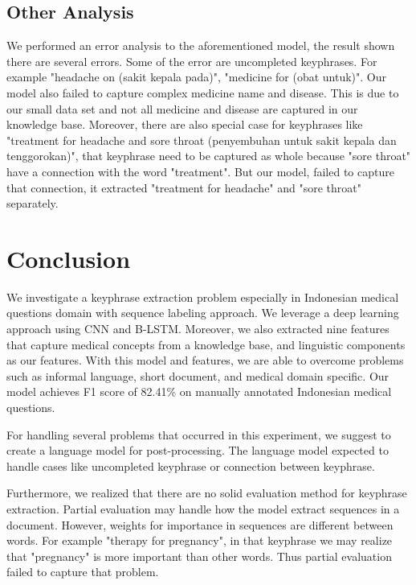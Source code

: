 \subsection{Other Analysis}
We performed an error analysis to the aforementioned model, the result shown there are several errors. Some of the error are uncompleted keyphrases. For example "headache on (sakit kepala pada)", "medicine for (obat untuk)". Our model also failed to capture complex medicine name and disease. This is due to our small data set and not all medicine and disease are captured in our knowledge base. Moreover, there are also special case for keyphrases like "treatment for headache and sore throat (penyembuhan untuk sakit kepala dan tenggorokan)", that keyphrase need to be captured as whole because "sore throat" have a connection with the word "treatment". But our model, failed to capture that connection, it extracted "treatment for headache" and "sore throat" separately.
\section{Conclusion}
We investigate a keyphrase extraction problem especially in Indonesian medical questions domain with sequence labeling approach. We leverage a deep learning approach using CNN and B-LSTM. Moreover, we also extracted nine features that capture medical concepts from a knowledge base, and linguistic components as our features. With this model and features, we are able to overcome problems such as informal language, short document, and medical domain specific. Our model achieves F1 score of 82.41\% on manually annotated Indonesian medical questions.

For handling several problems that occurred in this experiment, we suggest to create a language model for post-processing. The language model expected to handle cases like uncompleted keyphrase or connection between keyphrase.

Furthermore, we realized that there are no solid evaluation method for keyphrase extraction. Partial evaluation may handle how the model extract sequences in a document. However, weights for importance in sequences are different between words. For example "therapy for pregnancy", in that keyphrase we may realize that "pregnancy" is more important than other words. Thus partial evaluation failed to capture that problem.
